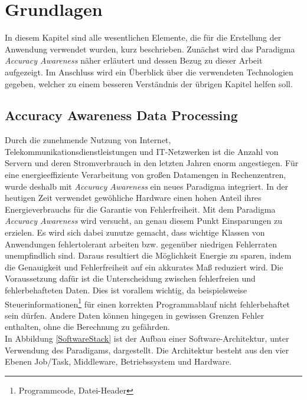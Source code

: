 \chapter{Grundlagen}\vspace{1cm}

In diesem Kapitel sind alle wesentlichen Elemente, die f\"ur die Erstellung der Anwendung verwendet wurden, kurz beschrieben. Zun\"achst wird das Paradigma \textit{Accuracy Awareness} n\"aher erl\"autert und dessen Bezug zu dieser Arbeit aufgezeigt. Im Anschluss wird ein \"Uberblick \"uber die verwendeten Technologien gegeben, welcher zu einem besseren Verst\"andnis der \"ubrigen Kapitel helfen soll. 

\section{Accuracy Awareness Data Processing}
Durch die zunehmende Nutzung von Internet, Telekommunikationsdienstleistungen und IT-Netzwerken ist die Anzahl von Servern und deren Stromverbrauch in den letzten Jahren enorm angestiegen. F\"ur eine energieeffiziente Verarbeitung von gro\ss en Datamengen in Rechenzentren, wurde deshalb mit \textit{Accuracy Awareness} ein neues Paradigma integriert. In der heutigen Zeit verwendet gew\"ohliche Hardware einen hohen Anteil ihres Energieverbrauchs f\"ur die Garantie von Fehlerfreiheit. Mit dem Paradigma \textit{Accuracy Awareness} wird versucht, an genau diesem Punkt Einsparungen zu erzielen. Es wird sich dabei zunutze gemacht, dass wichtige Klassen von Anwendungen fehlertolerant arbeiten bzw. gegen\"uber niedrigen Fehlerraten unempfindlich sind. Daraus resultiert die M\"oglichkeit Energie zu sparen, indem die Genauigkeit und Fehlerfreiheit auf ein akkurates Ma\ss {} reduziert wird. Die Voraussetzung daf\"ur ist die Unterscheidung zwischen fehlerfreien und fehlerbehafteten Daten. Dies ist vorallem wichtig, da beispielsweise Steuerinformationen\footnote{Programmcode, Datei-Header} f\"ur einen korrekten Programmablauf nicht fehlerbehaftet sein d\"urfen. Andere Daten k\"onnen hingegen in gewissen Grenzen Fehler enthalten, ohne die Berechnung zu gef\"ahrden. \\
In Abbildung \ref{SoftwareStack} ist der Aufbau einer Software-Architektur, unter Verwendung des Paradigams, dargestellt. Die Architektur besteht aus den vier Ebenen Job/Task, Middleware, Betriebssystem und Hardware. 

